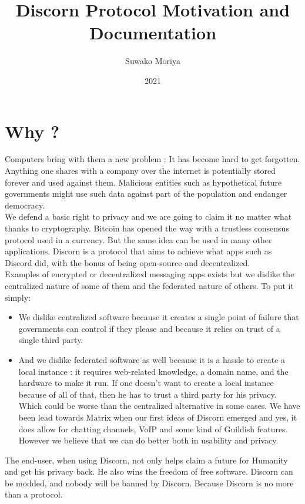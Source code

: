\documentclass[a4paper,10pt]{article}
\title{Discorn Protocol Motivation and Documentation}
\author{Suwako Moriya}
\date{2021}
\begin{document}
    \maketitle
    \tableofcontents
    \section{Why ?}
        Computers bring with them a new problem : It has become hard to get forgotten.
        Anything one shares with a company over the internet is potentially stored forever and used against them.
        Malicious entities such as hypothetical future governments might use such data against part of the population
        and endanger democracy.\\
        
        We defend a basic right to privacy and we are going to claim it no matter what thanks to cryptography.
        Bitcoin has opened the way with a trustless consensus protocol used in a currency. But the same idea
        can be used in many other applications. Discorn is a protocol that aims to achieve what apps such as Discord did,
        with the bonus of being open-source and decentralized.\\
        
        
        Examples of encrypted or decentralized messaging apps exists but we dislike the centralized nature of some of them
        and the federated nature of others. To put it simply:
        \begin{itemize}
         \item We dislike centralized software because it creates a single point of failure that governments can control
         if they please and because it relies on trust of a single third party.
        
         \item And we dislike federated software as well because it is a hassle to create a local instance : it requires web-related
         knowledge, a domain name, and the hardware to make it run. If one doesn't want to create a local instance because of all of that,
         then he has to trust a third party for his privacy. Which could be worse than the centralized alternative in some cases.
         We have been lead towards Matrix when our first ideas of Discorn emerged and yes, it does allow for chatting channels, VoIP and some kind of Guildish features.
         However we believe that we can do better both in usability and privacy.
        \end{itemize}
        The end-user, when using Discorn, not only helps claim a future for Humanity and get his privacy back. He also wins the freedom
        of free software. Discorn can be modded, and nobody will be banned by Discorn. Because Discorn is no more than a protocol.
    
\end{document}
